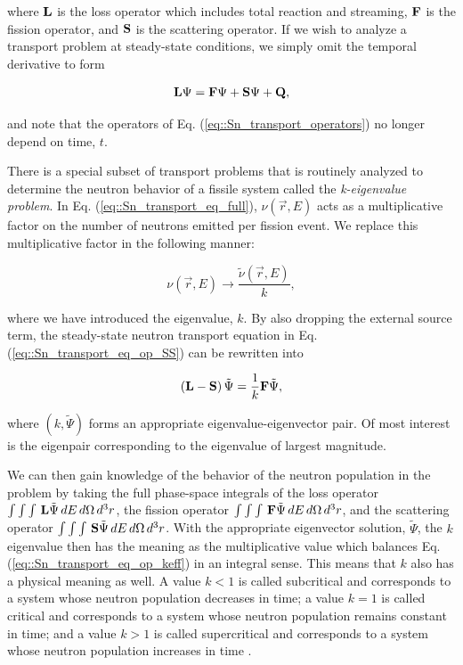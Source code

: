 \noindent where ${\bf L}$ is the loss operator which includes total reaction and streaming, ${\bf F}$ is the fission operator, and ${\bf S}$ is the scattering operator. If we wish to analyze a transport problem at steady-state conditions, we simply omit the temporal derivative to form

\begin{equation}
\label{eq::Sn_transport_eq_op_SS}
	 {\bf L} \Psi =  {\bf F} \Psi  + {\bf S} \Psi + {\bf Q},
\end{equation}

\noindent and note that the operators of Eq. (\ref{eq::Sn_transport_operators}) no longer depend on time, $t$.

There is a special subset of transport problems that is routinely analyzed to determine the neutron behavior of a fissile system called the {\em k-eigenvalue problem}. In Eq. (\ref{eq::Sn_transport_eq_full}), $\nu (\vec{r}, E)$ acts as a multiplicative factor on the number of neutrons emitted per fission event. We replace this multiplicative factor in the following manner:

\begin{equation}
\label{eq::Sn_nubar_k}
	\nu (\vec{r}, E) \rightarrow \frac{\tilde{\nu} (\vec{r}, E)}{k},
\end{equation}

\noindent where we have introduced the eigenvalue, $k$. By also dropping the external source term, the steady-state neutron transport equation in Eq. (\ref{eq::Sn_transport_eq_op_SS}) can be rewritten into

\begin{equation}
\label{eq::Sn_transport_eq_op_keff}
	\left( {\bf L}  - {\bf S} \right) \tilde{\Psi} =  \frac{1}{k} {\bf F} \tilde{\Psi} ,
\end{equation}

\noindent where $(k, \tilde{\Psi})$ forms an appropriate eigenvalue-eigenvector pair. Of most interest is the eigenpair corresponding to the eigenvalue of largest magnitude.

We can then gain knowledge of the behavior of the neutron population in the problem by taking the full phase-space integrals of the loss operator $\int  \int \int \, {\bf L} \tilde{\Psi} \, dE \, d\Omega \, d^3r$, the fission operator $\int  \int \int \, {\bf F} \tilde{\Psi} \, dE \, d\Omega \, d^3r$, and the scattering operator $\int  \int \int \, {\bf S} \tilde{\Psi} \, dE \, d\Omega \, d^3r$. With the appropriate eigenvector solution, $\tilde{\Psi}$, the $k$ eigenvalue then has the meaning as the multiplicative value which balances Eq. (\ref{eq::Sn_transport_eq_op_keff}) in an integral sense. This means that $k$ also has a physical meaning as well. A value $k<1$ is called subcritical and corresponds to a system whose neutron population decreases in time; a value $k=1$ is called critical and corresponds to a system whose neutron population remains constant in time; and a value $k>1$ is called supercritical and corresponds to a system whose neutron population increases in time \cite{ott1989}.


